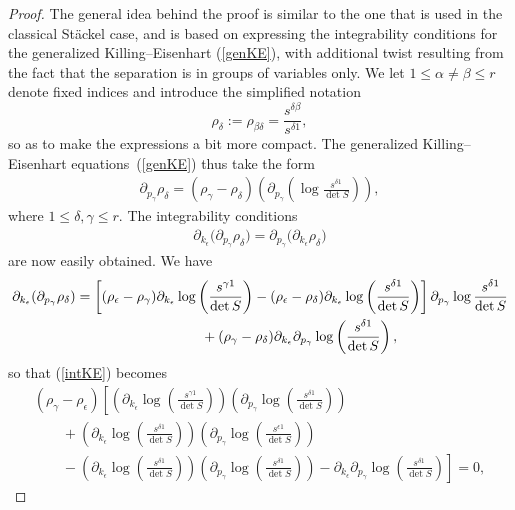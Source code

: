 \documentclass[11pt]{article}
\numberwithin{equation}{section}
\newcommand{\pgamma}{p_{\gamma}}
\newcommand{\kepsilon}{k_{\epsilon}}
\newcommand{\rhoepsilon}{\rho_{\epsilon}}
\newcommand{\rhogamma}{\rho_{\gamma}}
\newcommand{\rhodelta}{\rho_{\delta}}
\begin{document}
\begin{proof}
The general idea behind the proof is similar to the one that is used in the classical St\"ackel case, and is based on expressing the integrability conditions for the generalized Killing--Eisenhart (\ref{genKE}), with additional twist resulting from the fact that the separation is in groups of variables only. We let $1\leq \alpha \neq \beta \leq r$ denote fixed indices and introduce the simplified notation
\[
\rho_{\delta}:=\rho_{ \beta \delta}=\frac{s^{\delta \beta}}{s^{\delta 1}},
\]
so as to make the expressions a bit more compact. The generalized Killing--Eisenhart equa\-tions~(\ref{genKE}) thus take the form
\begin{gather*}%
\partial_{\pgamma} \rho_{\delta}= (\rho_{\gamma}-\rho_{\delta })\left(\partial_{\pgamma}\left(\log \frac{s^{\delta 1}}{\det S}\right)\right),
\end{gather*}
where $1\leq \delta,\gamma \leq r$. The integrability conditions
\begin{gather}\label{intKE}
\partial_{\kepsilon}\big(\partial_{\pgamma} \rhodelta \big)=\partial_{\pgamma}\big(\partial_{\kepsilon} \rhodelta \big)
\end{gather}
are now easily obtained. We have
\begin{gather*}
\partial_{\kepsilon} (\partial_{\pgamma} \rhodelta )= \left[(\rhoepsilon-\rhogamma)\partial_{\kepsilon}\log\left(\frac{s^{\gamma 1}}{\det S}\right)-(\rhoepsilon-\rhodelta)\partial_{\kepsilon}\log\left(\frac{s^{\delta 1}}{\det S}\right)\right] \partial_{\pgamma} \log \frac{s^{\delta 1}}{\det S} \\
\hphantom{\partial_{\kepsilon} (\partial_{\pgamma} \rhodelta )=}{} + (\rhogamma-\rhodelta)\partial_{\kepsilon}\partial_{\pgamma}\log\left(\frac{s^{\delta 1}}{\det S}\right),
\end{gather*}
so that (\ref{intKE}) becomes
\begin{gather}
(\rho_{\gamma}-\rho_{\epsilon})\left[\left(\partial_{\kepsilon}\log\left(\frac{s^{\gamma 1}}{\det S}\right)\right)\left(\partial_{\pgamma}\log\left(\frac{s^{\delta 1}}{\det S}\right)\right)\right.\nonumber\\
\qquad{} +\left(\partial_{\kepsilon}\log\left(\frac{s^{\delta 1}}{\det S}\right)\right)\left(\partial_{\pgamma}\log\left(\frac{s^{\epsilon 1}}{\det S}\right)\right) \nonumber\\
\left.\qquad{} -\left(\partial_{\kepsilon}\log\left(\frac{s^{\delta 1}}{\det S}\right)\right)\left(\partial_{\pgamma}\log\left(\frac{s^{\delta 1}}{\det S}\right)\right)-\partial_{\kepsilon}\partial_{\pgamma}\log\left(\frac{s^{\delta 1}}{\det S}\right)\right]=0,\label{compat}

\end{gather}
\end{proof}
\end{document}

